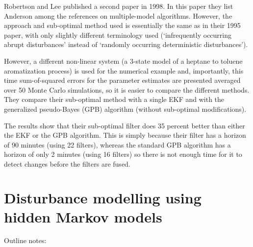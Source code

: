 Robertson and Lee published a second paper in 1998. In this paper they list Anderson \cite{andersson_adaptive_1985} among the references on multiple-model algorithms.  However, the approach and sub-optimal method used is essentially the same as in their 1995 paper, with only slightly different terminology used (`infrequently occurring abrupt disturbances' instead of `randomly occurring deterministic disturbances'). 

However, a different non-linear system (a 3-state model of a heptane to toluene aromatization process) is used for the numerical example and, importantly, this time sum-of-squared errors for the parameter estimates are presented averaged over 50 Monte Carlo simulations, so it is easier to compare the different methods. They compare their sub-optimal method with a single EKF and with the generalized pseudo-Bayes (GPB) algorithm (without sub-optimal modifications).

The results show that their sub-optimal filter does 35 percent better than either the EKF or the GPB algorithm. This is simply because their filter has a horizon of 90 minutes (using 22 filters), whereas the standard GPB algorithm has a horizon of only 2 minutes (using 16 filters) so there is not enough time for it to detect changes before the filters are fused.

\section*{Disturbance modelling using hidden Markov models}
\label{hidden_markov_models}

Outline notes:

